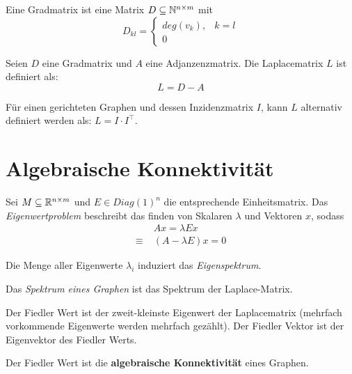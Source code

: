 \begin{definition}
    Eine Gradmatrix ist eine Matrix $ D \subseteq \mathbb{N}^{n \times m} $ mit
    \begin{equation*}
        D_{kl} = \begin{cases}
            deg(v_k), & k = l \\
            0
        \end{cases}
    \end{equation*}
\end{definition}

\begin{definition}[Laplacematrix]
    Seien $ D $ eine Gradmatrix und $ A $ eine Adjanzenzmatrix.
    Die Laplacematrix $ L $ ist definiert als:
    \begin{equation*}
        L = D - A
    \end{equation*}

    Für einen gerichteten Graphen und dessen Inzidenzmatrix $ I $, kann $ L $ alternativ definiert werden als: $ L = I \cdot I^\top $.
\end{definition}

\section{Algebraische Konnektivität}

\begin{definition}[Eigenwertproblem]
    Sei $ M \subseteq \mathbb{R}^{n \times m} $ und $ E \in Diag(1)^n $ die entsprechende Einheitsmatrix.
    Das \textit{Eigenwertproblem} beschreibt das finden von Skalaren $ \lambda $ und Vektoren $ x $, sodass
    \begin{align*}
        & Ax = \lambda Ex \\
        \equiv \; & (A - \lambda E) x = 0
    \end{align*}

    Die Menge aller Eigenwerte $ \lambda_i $ induziert das \textit{Eigenspektrum}.
\end{definition}

\begin{definition}
    Das \textit{Spektrum eines Graphen} ist das Spektrum der Laplace-Matrix.
\end{definition}

\begin{definition}
    Der Fiedler Wert ist der zweit-kleinste Eigenwert der Laplacematrix (mehrfach vorkommende Eigenwerte werden mehrfach gezählt).
    Der Fiedler Vektor ist der Eigenvektor des Fiedler Werts.

    Der Fiedler Wert ist die \textbf{algebraische Konnektivität} eines Graphen.
\end{definition}

